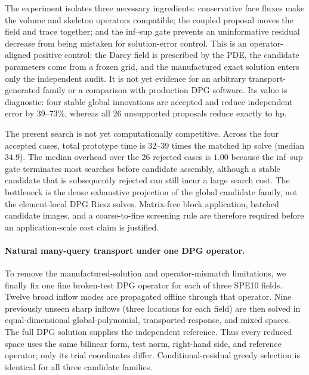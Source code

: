 \documentclass[11pt]{article}
\numberwithin{algorithm}{section}
\theoremstyle{definition}\newtheorem{definition}[theorem]{Definition}
\theoremstyle{remark}\newtheorem{remark}[theorem]{Remark}
\begin{document}
The experiment isolates three necessary ingredients: conservative face fluxes
make the volume and skeleton operators compatible; the coupled proposal moves
the field and trace together; and the inf--sup gate prevents an uninformative
residual decrease from being mistaken for solution-error control. This is an
operator-aligned positive control: the Darcy field is prescribed by the PDE,
the candidate parameters come from a frozen grid, and the manufactured exact
solution enters only the independent audit. It is not yet evidence for an
arbitrary transport-generated family or a comparison with production DPG software.
Its value is diagnostic: four stable global innovations are
accepted and reduce independent error by $39$--$73\%$, whereas all 26
unsupported proposals reduce exactly to hp.

The present search is not yet computationally competitive.  Across the four
accepted cases, total prototype time is $32$--$39$ times the matched hp solve
(median $34.9$).  The median overhead over the 26 rejected cases is $1.00$
because the inf--sup gate terminates most searches before candidate assembly,
although a stable candidate that is subsequently rejected can still incur a
large search cost.  The bottleneck is the dense exhaustive projection of the
global candidate family, not the element-local DPG Riesz solves.  Matrix-free block
application, batched candidate images, and a coarse-to-fine screening rule are
therefore required before an application-scale cost claim is justified.

\paragraph{Natural many-query transport under one DPG operator.}
To remove the manufactured-solution and operator-mismatch limitations, we
finally fix one fine broken-test DPG operator for each of three SPE10 fields.
Twelve broad inflow modes are propagated offline through that operator.  Nine
previously unseen sharp inflows (three locations for each field) are then
solved in equal-dimensional global-polynomial, transported-response, and mixed
spaces.  The full DPG solution supplies the independent reference.  Thus every
reduced space uses the same bilinear form, test norm, right-hand side, and
reference operator; only its trial coordinates differ.  Conditional-residual
greedy selection is identical for all three candidate families.
\end{document}

